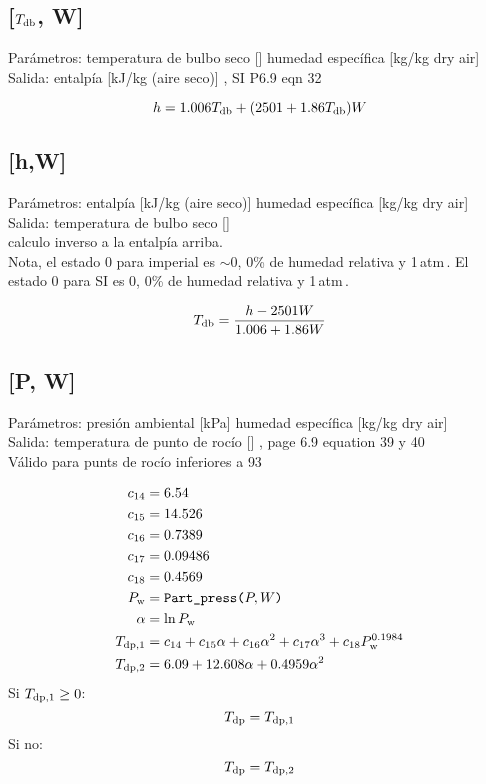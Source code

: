 \documentclass[letterpaper]{article}
\newcommand*\Tdb{\ensuremath{T\sub{db}}}
\newcommand*\Tdp{\ensuremath{T\sub{dp}}}
\newcommand*\Pw{\ensuremath{P\sub{w}}}
\begin{document}
\subsection{[\Tdb, W]}
\noindent Parámetros:
\vardef{\Tdb}temperatura de bulbo seco [\degC]
humedad específica [kg/kg dry air]
\\Salida:
entalpía [kJ/kg (aire seco)]
\ashref, SI P6.9 eqn 32

\begin{equation}
    h = 1.006\Tdb + (2501 + 1.86\Tdb)W
\end{equation}


\subsection{[h,W]}
\noindent Parámetros:
entalpía [kJ/kg (aire seco)]
humedad específica [kg/kg dry air]
\\Salida:
\vardef{\Tdb}temperatura de bulbo seco [\degC]
\\calculo inverso a la entalpía arriba.
\\Nota, el estado 0 para imperial es $\sim0$\degF, 0\% de humedad relativa y 1\,atm\,.
El estado 0 para SI es 0\degC, 0\% de humedad relativa y 1\,atm\,.

\begin{equation}
	\Tdb = \frac{h-2501W}{1.006+1.86W}
\end{equation}
    

\subsection{[P, W]}
\noindent Parámetros:
presión ambiental [kPa]
humedad específica [kg/kg dry air]
\\Salida:
\vardef{\Tdp}temperatura de punto de rocío [\degC]
\ashref, page 6.9 equation 39 y 40
\\Válido para punts de rocío inferiores a 93\degC

\begin{align}
    c_{14} &= 6.54 \\
    c_{15} &= 14.526 \\
    c_{16} &= 0.7389 \\
    c_{17} &= 0.09486 \\
    c_{18} &= 0.4569 \\
    \Pw &= \funcname{Part\_press}[P, W] \\
    \alpha &= \ln\Pw \\
    T\sub[1]{dp} &= c_{14} + c_{15}\alpha + c_{16}\alpha^2 + c_{17}\alpha^3 + c_{18}\Pw^{0.1984} \\
    T\sub[2]{dp} &= 6.09 + 12.608\alpha + 0.4959\alpha^2
\end{align}
Si $T\sub[1]{dp}\ge0$:
\begin{equation}
	\Tdp=T\sub[1]{dp}
\end{equation}
Si no:
\begin{equation}
	\Tdp=T\sub[2]{dp}
\end{equation}
\end{document}
